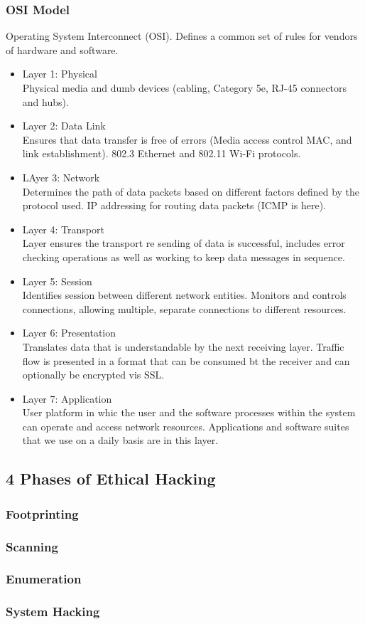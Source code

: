 \subsubsection{OSI Model}
Operating System Interconnect (OSI).
Defines a common set of rules for vendors of hardware and software.
\begin{itemize}
    \item Layer 1: Physical\\
    Physical media and dumb devices (cabling, Category 5e, RJ-45 connectors and hubs).
    \item Layer 2: Data Link\\
    Ensures that data transfer is free of errors (Media access control MAC, and link establishment).
    802.3 Ethernet and 802.11 Wi-Fi protocols.
    \item LAyer 3: Network\\
    Determines the path of data packets based on different factors defined by the protocol used.
    IP addressing for routing data packets (ICMP is here).
    \item Layer 4: Transport\\
    Layer ensures the transport re sending of data is successful, includes error checking operations as well as working to keep data messages in sequence.
    \item Layer 5: Session\\
    Identifies session between different network entities.
    Monitors and controls connections, allowing multiple, separate connections to different resources.
    \item Layer 6: Presentation\\
    Translates data that is understandable by the next receiving layer.
    Traffic flow is presented in a format that can be consumed bt the receiver and can optionally be encrypted vis SSL.
    \item Layer 7: Application\\
    User platform in whic the user and the software processes within the system can operate and access network resources.
    Applications and software suites that we use on a daily basis are in this layer.
\end{itemize}
\subsection{4 Phases of Ethical Hacking}

\subsubsection{Footprinting}


\subsubsection{Scanning}
\subsubsection{Enumeration}
\subsubsection{System Hacking}
